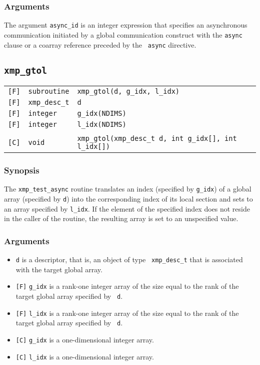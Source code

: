 \subsubsection*{Arguments}

The argument {\tt async\_id} is an integer expression that specifies an
asynchronous communication initiated by a global communication construct
with the {\tt async} clause or a coarray reference preceded by the {\tt
async} directive.

\vspace{0.3cm}

\subsection{\tt xmp\_gtol}

\begin{tabular}{lll}

\verb![F]!& {\tt subroutine} & {\tt xmp\_gtol(d, g\_idx, l\_idx)} \\
\verb![F]!& {\tt xmp\_desc\_t} & {\tt d}\\
\verb![F]!& {\tt integer} & {\tt g\_idx(NDIMS)}\\
\verb![F]!& {\tt integer} & {\tt l\_idx(NDIMS)}\\
          & & \\
\verb![C]!&  {\tt void} & {\tt xmp\_gtol(xmp\_desc\_t d, int g\_idx[], int l\_idx[])}

\end{tabular}

\subsubsection*{Synopsis}

The {\tt xmp\_test\_async} routine translates an index (specified by
{\tt g\_idx}) of a global array (specified by {\tt d}) into the
corresponding index of its local section and sets to an array specified
by {\tt l\_idx}. If the element of the specified index does not reside
in the caller of the routine, the resulting array is set to an
unspecified value.

\subsubsection*{Arguments}

\begin{itemize}
 \item {\tt d} is a descriptor, that is, an object of type {\tt
       xmp\_desc\_t} that is associated with the target global array.
 \item \verb![F]! {\tt g\_idx} is a rank-one integer array of the size
       equal to the rank of the target global array specified by {\tt
       d}.
 \item \verb![F]! {\tt l\_idx} is a rank-one integer array of the size
       equal to the rank of the target global array specified by {\tt
       d}.
 \item \verb![C]! {\tt g\_idx} is a one-dimensional integer array.
 \item \verb![C]! {\tt l\_idx} is a one-dimensional integer array.
\end{itemize}


